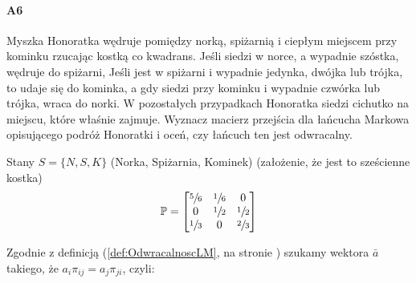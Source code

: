 \documentclass[a4paper,12pt]{article}
\theoremstyle{definition}%
\theoremstyle{definition}
\theoremstyle{problem}
\begin{document}
\paragraph{A6} Myszka Honoratka wędruje pomiędzy norką, spiżarnią i ciepłym miejscem przy kominku rzucając kostką co kwadrans. Jeśli siedzi w norce, a wypadnie szóstka, wędruje do spiżarni, Jeśli jest w spiżarni i wypadnie jedynka, dwójka lub trójka, to udaje się do kominka, a gdy siedzi przy kominku i wypadnie czwórka lub trójka, wraca do norki. W pozostałych przypadkach Honoratka siedzi cichutko na miejscu, które właśnie zajmuje. Wyznacz macierz przejścia dla łańcucha Markowa opisującego podróż Honoratki i oceń, czy łańcuch ten jest odwracalny.

Stany $S=\{N,S,K\}$ (Norka, Spiżarnia, Kominek) (założenie, że jest to sześcienne kostka)
$$\mathbb{P}=\begin{bmatrix}
\sfrac{5}{6}&\sfrac{1}{6}&0\\
0&\sfrac{1}{2}&\sfrac{1}{2}\\
\sfrac{1}{3}&0&\sfrac{2}{3}
\end{bmatrix}$$
\begin{figure}[H]
\centering
{}
\end{figure}
Zgodnie z definicją (\ref{def:OdwracalnoscLM}, na stronie \pageref{def:OdwracalnoscLM}) szukamy wektora $\bar{a}$ takiego, że $a_i\pi_{ij}=a_j\pi_{ji}$, czyli:
\end{document}
